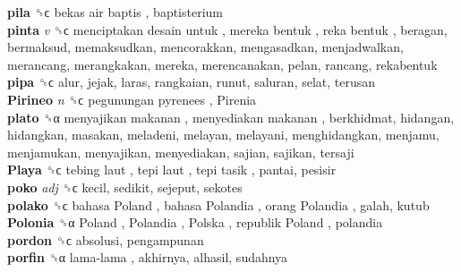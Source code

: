 \textbf{pila} ␝ϲ   bekas air baptis , baptisterium  \\
\textbf{pinta} \emph{v}  ␝ϲ   menciptakan desain untuk ,  mereka bentuk ,  reka bentuk , beragan, bermaksud, memaksudkan, mencorakkan, mengasadkan, menjadwalkan, merancang, merangkakan, mereka, merencanakan, pelan, rancang, rekabentuk  \\
\textbf{pipa} ␝ϲ  alur, jejak, laras, rangkaian, runut, saluran, selat, terusan  \\
\textbf{Pirineo} \emph{n}  ␝ϲ   pegunungan pyrenees ,  Pirenia   \\
\textbf{plato} ␝α   menyajikan makanan ,  menyediakan makanan , berkhidmat, hidangan, hidangkan, masakan, meladeni, melayan, melayani, menghidangkan, menjamu, menjamukan, menyajikan, menyediakan, sajian, sajikan, tersaji  \\
\textbf{Playa} ␝ϲ   tebing laut ,  tepi laut ,  tepi tasik , pantai, pesisir  \\
\textbf{poko} \emph{adj}  ␝ϲ  kecil, sedikit, sejeput, sekotes  \\
\textbf{polako} ␝ϲ   bahasa Poland ,  bahasa Polandia ,  orang Polandia , galah, kutub  \\
\textbf{Polonia} ␝α   Poland ,  Polandia ,  Polska ,  republik Poland , polandia  \\
\textbf{pordon} ␝ϲ  absolusi, pengampunan  \\
\textbf{porfin} ␝α   lama-lama , akhirnya, alhasil, sudahnya  \\
